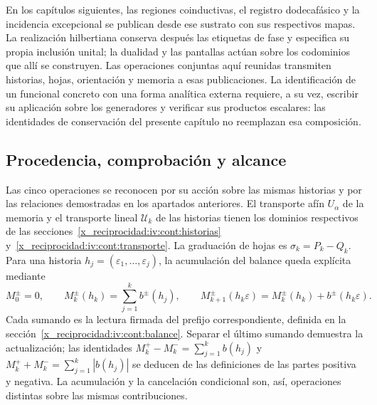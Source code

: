 En los capítulos siguientes, las regiones coinductivas, el registro dodecafásico y la incidencia excepcional se publican desde ese sustrato con sus respectivos mapas. La realización hilbertiana conserva después las etiquetas de fase y especifica su propia inclusión unital; la dualidad y las pantallas actúan sobre los codominios que allí se construyen. Las operaciones conjuntas aquí reunidas transmiten historias, hojas, orientación y memoria a esas publicaciones. La identificación de un funcional concreto con una forma analítica externa requiere, a su vez, escribir su aplicación sobre los generadores y verificar sus productos escalares: las identidades de conservación del presente capítulo no reemplazan esa composición.

\subsection{Procedencia, comprobación y alcance}
\label{x_reciprocidad:iv:cont:mapa-correlativo}
Las cinco operaciones se reconocen por su acción sobre las mismas
historias y por las relaciones demostradas en los apartados anteriores.
El transporte afín \(U_\alpha\) de la memoria y el transporte
lineal \(\mathcal U_k\) de las historias tienen los dominios
respectivos de las secciones~\ref{x_reciprocidad:iv:cont:historias}
y~\ref{x_reciprocidad:iv:cont:transporte}. La graduación de hojas es
\(\sigma_k=P_k-Q_k\). Para una historia
\(h_j=(\varepsilon_1,\ldots,\varepsilon_j)\), la acumulación del
balance queda explícita mediante
\[
 M_0^\pm=0,\qquad
 M_k^\pm(h_k)=\sum_{j=1}^k b^\pm(h_j),\qquad
 M_{k+1}^\pm(h_k\varepsilon)
 =M_k^\pm(h_k)+b^\pm(h_k\varepsilon).
\]
Cada sumando es la lectura firmada del prefijo correspondiente,
definida en la sección~\ref{x_reciprocidad:iv:cont:balance}. Separar el último
sumando demuestra la actualización; las identidades
\(M_k^+-M_k^-=\sum_{j=1}^kb(h_j)\) y
\(M_k^++M_k^-=\sum_{j=1}^k|b(h_j)|\) se deducen de las
definiciones de las partes positiva y negativa. La acumulación y la
cancelación condicional son, así, operaciones distintas sobre las
mismas contribuciones.

